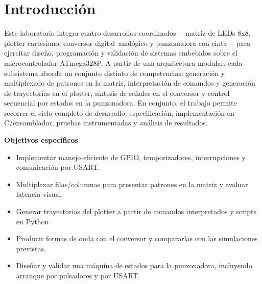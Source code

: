 \section{Introducción}

Este laboratorio integra cuatro desarrollos coordinados —matriz de LEDs 8x8, plotter cartesiano, conversor digital–analógico y punzonadora con cinta— para ejercitar diseño, programación y validación de sistemas embebidos sobre el microcontrolador ATmega328P. A partir de una arquitectura modular, cada subsistema aborda un conjunto distinto de competencias: generación y multiplexado de patrones en la matriz, interpretación de comandos y generación de trayectorias en el plotter, síntesis de señales en el conversor y control secuencial por estados en la punzonadora. En conjunto, el trabajo permite recorrer el ciclo completo de desarrollo: especificación, implementación en C/ensamblador, pruebas instrumentadas y análisis de resultados.

\textbf{Objetivos específicos}
\begin{itemize}
  \item Implementar manejo eficiente de GPIO, temporizadores, interrupciones y comunicación por USART.
  \item Multiplexar filas/columnas para presentar patrones en la matriz y evaluar latencia visual.
  \item Generar trayectorias del plotter a partir de comandos interpretados y scripts en Python.
  \item Producir formas de onda con el conversor y compararlas con las simulaciones previstas.
  \item Diseñar y validar una máquina de estados para la punzonadora, incluyendo arranque por pulsadores y por USART.
\end{itemize}
